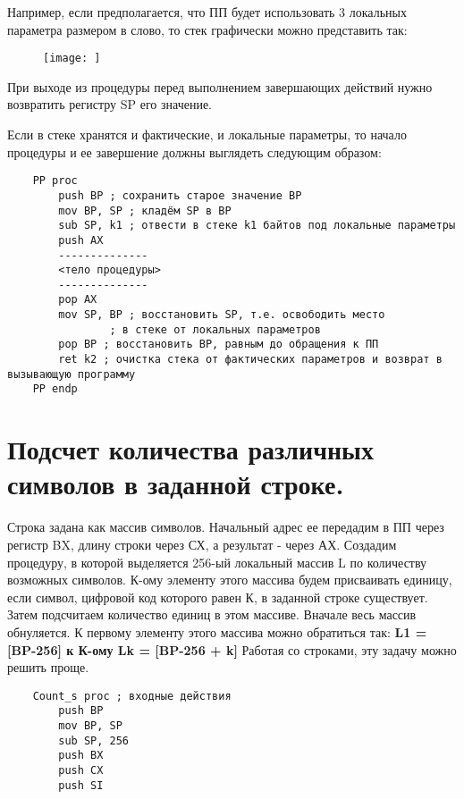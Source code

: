 Например, если предполагается, что ПП будет использовать 3 локальных параметра размером в слово, то стек графически можно представить так:
\begin{figure}
    \texttt{[image: ]}
\end{figure}
При выходе из процедуры перед выполнением завершающих действий нужно возвратить регистру SP его значение.

Если в стеке хранятся и фактические, и локальные параметры, то начало процедуры и ее завершение должны выглядеть следующим образом:
\begin{verbatim}
    PP proc
        push BP ; сохранить старое значение ВР
        mov BP, SP ; кладём SP в ВР
        sub SP, k1 ; отвести в стеке k1 байтов под локальные параметры
        push AX
        --------------
        <тело процедуры>
        --------------
        pop AX
        mov SP, BP ; восстановить SP, т.е. освободить место
                ; в стеке от локальных параметров
        pop BP ; восстановить ВР, равным до обращения к ПП
        ret k2 ; очистка стека от фактических параметров и возврат в вызывающую программу
    PP endp
\end{verbatim}

\section{Подсчет количества различных символов в заданной строке.}

Строка задана как массив символов. Начальный адрес ее передадим в ПП через регистр BX, длину строки через СХ, а результат - через АХ. Создадим процедуру, в которой выделяется 256-ый локальный массив L по количеству возможных символов.
К-ому элементу этого массива будем присваивать единицу, если символ, цифровой код которого равен К, в заданной строке существует. Затем подсчитаем количество единиц в этом массиве. Вначале весь массив обнуляется.
К первому элементу этого массива можно обратиться так: \textbf{L1 = [BP-256] к К-ому Lk = [BP-256 + k]}
Работая со строками, эту задачу можно решить проще.
\begin{verbatim}
    Count_s proc ; входные действия
        push BP
        mov BP, SP
        sub SP, 256
        push BX
        push CX
        push SI
\end{verbatim}